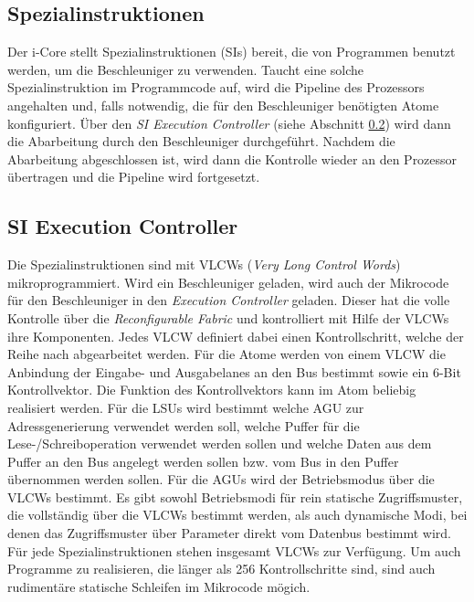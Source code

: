 \subsection{Spezialinstruktionen}
\label{sec:special_instruction}
Der i-Core stellt Spezialinstruktionen (SIs) bereit, die von Programmen benutzt werden, um die Beschleuniger zu verwenden.
Taucht eine solche Spezialinstruktion im Programmcode auf, wird die Pipeline des Prozessors angehalten und, falls notwendig,
die für den Beschleuniger benötigten Atome konfiguriert. Über den \textit{SI Execution Controller} (siehe Abschnitt \ref{sec:si_exec_ctl})
wird dann die Abarbeitung durch den Beschleuniger durchgeführt. Nachdem die Abarbeitung abgeschlossen ist, wird dann die Kontrolle wieder an den Prozessor übertragen
und die Pipeline wird fortgesetzt.

\subsection{SI Execution Controller}
\label{sec:si_exec_ctl}
Die Spezialinstruktionen sind mit VLCWs (\textit{Very Long Control Words}) mikroprogrammiert. Wird ein Beschleuniger geladen,
wird auch der Mikrocode für den Beschleuniger in den \textit{Execution Controller} geladen. Dieser hat die volle Kontrolle über die
\textit{Reconfigurable Fabric} und kontrolliert mit Hilfe der VLCWs ihre Komponenten. Jedes VLCW definiert dabei einen Kontrollschritt,
welche der Reihe nach abgearbeitet werden. Für die Atome werden von einem VLCW die Anbindung der Eingabe- und Ausgabelanes an den Bus
bestimmt sowie ein 6-Bit Kontrollvektor. Die Funktion des Kontrollvektors kann im Atom beliebig realisiert werden. Für die LSUs wird bestimmt
welche AGU zur Adressgenerierung verwendet werden soll, welche Puffer für die Lese-/Schreiboperation verwendet werden sollen und
welche Daten aus dem Puffer an den Bus angelegt werden sollen bzw. vom Bus in den Puffer übernommen werden sollen.
Für die AGUs wird der Betriebsmodus über die VLCWs bestimmt. Es gibt sowohl Betriebsmodi für rein statische Zugriffsmuster,
die vollständig über die VLCWs bestimmt werden, als auch dynamische Modi, bei denen das Zugriffsmuster über Parameter direkt vom Datenbus bestimmt wird.
Für jede Spezialinstruktionen stehen insgesamt  VLCWs zur Verfügung. Um auch Programme zu realisieren,
die länger als 256 Kontrollschritte sind, sind auch rudimentäre statische Schleifen im Mikrocode mögich.

